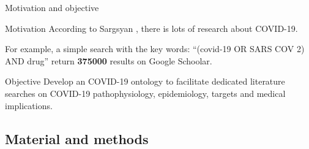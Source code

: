 \documentclass[10pt]{beamer}
\newcommand{\1}{
        	\setbeamertemplate{background}{
        		\texttt{[image: img/1]}
        		\tikz[overlay] \fill[fill opacity=0.75,fill=white] (0,0) rectangle (-\paperwidth,\paperheight);
        	}
}
\begin{document}
\begin{frame}{Motivation and objective}{}		
	\begin{block}{Motivation}
		According to Sargsyan \cite{sargsyan2020covid}, there is lots of research about COVID-19. 
	\end{block}	

	\begin{block}{}
		For example, a simple search with the key words: ``(covid-19 OR SARS COV 2) AND drug'' return \textbf{375000} results on Google Schoolar.
	\end{block}	

	\begin{block}{Objective}
		Develop an COVID-19 ontology to facilitate dedicated literature searches on COVID-19 pathophysiology, epidemiology, targets and medical implications.
	\end{block}	
\end{frame}



\subsection{Material and methods}
\end{document}
